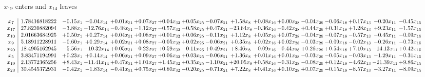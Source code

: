 \documentclass[9pt]{article}
\begin{document}
 $ x_{19} $ enters and $ x_{14} $ leaves 

 \[\begin{array}{c| c c@{\hskip 2pt} c@{\hskip 2pt} c@{\hskip 2pt} c@{\hskip 2pt} c@{\hskip 2pt} c@{\hskip 2pt} c@{\hskip 2pt} c@{\hskip 2pt} c@{\hskip 2pt} c@{\hskip 2pt} c@{\hskip 2pt} c@{\hskip 2pt} c@{\hskip 2pt} c@{\hskip 2pt} c@{\hskip 2pt} }
 x_{7}   &  1.78416818222 & -0.15 x_{1} & -0.04 x_{14} & +  0.01 x_{31} & +  0.07 x_{27} & +  0.04 x_{32} & +  0.05 x_{25} & -0.07 x_{21} & +  1.58 x_{8} & +  0.08 x_{16} & +  0.00 x_{28} & -0.04 x_{29} & -0.06 x_{18} & +  0.17 x_{13} & -0.20 x_{11} & -0.45 x_{15}\\
 x_{17}   &  27.8239882094 & -3.88 x_{1} & -12.76 x_{14} & -0.48 x_{31} & -1.12 x_{27} & -0.57 x_{32} & -0.58 x_{25} & +  0.47 x_{21} & -23.64 x_{8} & -0.36 x_{16} & -0.42 x_{28} & +  0.44 x_{29} & +  0.31 x_{18} & +  1.28 x_{13} & +  9.23 x_{11} & -1.57 x_{15}\\
 x_{10}   &  2.01663684925 & +  0.50 x_{1} & +  0.27 x_{14} & +  0.04 x_{31} & +  0.08 x_{27} & +  0.01 x_{32} & +  0.06 x_{25} & -0.11 x_{21} & +  1.12 x_{8} & +  0.05 x_{16} & +  0.07 x_{28} & -0.04 x_{29} & -0.07 x_{18} & -0.57 x_{13} & -0.45 x_{11} & -0.09 x_{15}\\
 x_{9}   &  5.18911228911 & -0.60 x_{1} & +  0.29 x_{14} & +  0.02 x_{31} & +  0.08 x_{27} & -0.05 x_{32} & +  0.02 x_{25} & -0.06 x_{21} & +  0.35 x_{8} & +  0.02 x_{16} & +  0.02 x_{28} & -0.03 x_{29} & -0.09 x_{18} & -0.02 x_{13} & -0.26 x_{11} & -0.73 x_{15}\\
 x_{20}   &  18.4905162945 & -5.56 x_{1} & -10.32 x_{14} & +  0.05 x_{31} & -0.22 x_{27} & +  0.59 x_{32} & -0.11 x_{25} & +  0.49 x_{21} & +  8.46 x_{8} & -0.09 x_{16} & -0.44 x_{28} & +  0.26 x_{29} & +  0.54 x_{18} & +  7.10 x_{13} & -14.13 x_{11} & +  0.42 x_{15}\\
 x_{5}   &  3.83471194991 & +  0.23 x_{1} & +  0.14 x_{14} & +  0.06 x_{31} & +  0.09 x_{27} & +  0.06 x_{32} & +  0.03 x_{25} & -0.06 x_{21} & +  1.36 x_{8} & +  0.01 x_{16} & +  0.01 x_{28} & -0.03 x_{29} & -0.05 x_{18} & -0.03 x_{13} & -1.29 x_{11} & -0.31 x_{15}\\
 x_{19}   &  2.13772365256 & +  8.43 x_{1} & -11.41 x_{14} & +  0.47 x_{31} & +  1.01 x_{27} & +  1.45 x_{32} & +  0.35 x_{25} & -1.10 x_{21} & + 20.05 x_{8} & +  0.58 x_{16} & -0.31 x_{28} & -0.08 x_{29} & +  0.12 x_{18} & -4.62 x_{13} & -21.39 x_{11} & +  9.86 x_{15}\\
 x_{23}   &  30.4545372931 & -0.42 x_{1} & -1.83 x_{14} & -0.41 x_{31} & +  0.75 x_{27} & +  0.80 x_{32} & -0.20 x_{25} & -0.71 x_{21} & +  7.22 x_{8} & +  0.41 x_{16} & +  0.10 x_{28} & +  0.07 x_{29} & -0.15 x_{18} & -8.57 x_{13} & -3.27 x_{11} & -8.09 x_{15}\\

\end{array}\]
\end{document}
